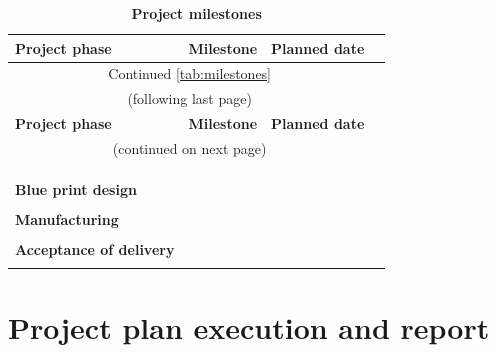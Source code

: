 \renewcommand\arraystretch{1.0}
\begin{longtable}{|m{4cm}<{\centering}|m{6cm}<{\centering}|m{4cm}<{\centering}|}
\caption{\textbf{Project milestones}}
\label{tab:milestones}\\
\toprule
\textbf{Project phase} & \textbf{Milestone} & \textbf{Planned date} \\
\midrule
\endfirsthead
\multicolumn{3}{c}{Continued \autoref{tab:milestones}}\\
\multicolumn{3}{c}{(following last page)}\\
\toprule
\textbf{Project phase} & \textbf{Milestone} & \textbf{Planned date} \\
\midrule
\endhead
\bottomrule
\multicolumn{3}{c}{(continued on next page)}
\endfoot
\bottomrule
\endlastfoot

\multirow{3}{*}{\bfseries \footnotesize Project preparation} &   &   \\
\cline{2-3}
                         &   &   \\
\cline{2-3}
                         &   &   \\
\cline{2-3}
                         &   &   \\
\midrule
\multirow{3}{*}{\bfseries \footnotesize Blue print design} &   &   \\
\cline{2-3}
                         &   &   \\
\cline{2-3}
                         &   &   \\
\cline{2-3}
                         &   &   \\
\midrule
\multirow{3}{*}{\bfseries \footnotesize Manufacturing} &   &   \\
\cline{2-3}
                         &   &   \\
\cline{2-3}
                         &   &   \\
\cline{2-3}
                         &   &   \\
\midrule
\multirow{3}{*}{\bfseries \footnotesize Acceptance of delivery} &   &   \\
\cline{2-3}
                         &   &   \\
\cline{2-3}
                         &   &   \\
\cline{2-3}
                         &   &   \\

\end{longtable}

\section{Project plan execution and report}

